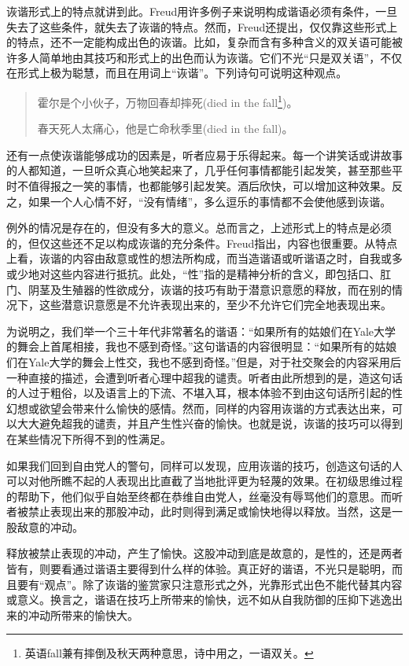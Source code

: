 \documentclass[UTF8,10pt,a4paper,openany]{book}
\begin{document}
诙谐形式上的特点就讲到此。Freud用许多例子来说明构成谐语必须有条件，一旦失去了这些条件，就失去了诙谐的特点。然而，Freud还提出，仅仅靠这些形式上的特点，还不一定能构成出色的诙谐。比如，复杂而含有多种含义的双关语可能被许多人简单地由其技巧和形式上的出色而认为诙谐。它们不光“只是双关语”，不仅在形式上极为聪慧，而且在用词上“诙谐”。下列诗句可说明这种观点。
\begin{quote}
    霍尔是个小伙子，万物回春却摔死(died in the fall\footnote{英语fall兼有摔倒及秋天两种意思，诗中用之，一语双关。})。\vspace{-6pt}
    
    春天死人太痛心，他是亡命秋季里(died in the fall)。
\end{quote}

还有一点使诙谐能够成功的因素是，听者应易于乐得起来。每一个讲笑话或讲故事的人都知道，一旦听众真心地笑起来了，几乎任何事情都能引起发笑，甚至那些平时不值得报之一笑的事情，也都能够引起发笑。酒后欣快，可以增加这种效果。反之，如果一个人心情不好，“没有情绪”，多么逗乐的事情都不会使他感到诙谐。

例外的情况是存在的，但没有多大的意义。总而言之，上述形式上的特点是必须的，但仅这些还不足以构成诙谐的充分条件。Freud指出，内容也很重要。从特点上看，诙谐的内容由敌意或性的想法所构成，而当造谐语或听谐语之时，自我或多或少地对这些内容进行抵抗。此处，“性”指的是精神分析的含义，即包括口、肛门、阴茎及生殖器的性欲成分，诙谐的技巧有助于潜意识意愿的释放，而在别的情况下，这些潜意识意愿是不允许表现出来的，至少不允许它们完全地表现出来。

为说明之，我们举一个三十年代非常著名的谐语：“如果所有的姑娘们在Yale大学的舞会上首尾相接，我也不感到奇怪。”这句谐语的内容很明显：“如果所有的姑娘们在Yale大学的舞会上性交，我也不感到奇怪。”但是，对于社交聚会的内容采用后一种直接的描述，会遭到听者心理中超我的谴责。听者由此所想到的是，造这句话的人过于粗俗，以及语言上的下流、不堪入耳，根本体验不到由这句话所引起的性幻想或欲望会带来什么愉快的感情。然而，同样的内容用诙谐的方式表达出来，可以大大避免超我的谴责，并且产生性兴奋的愉快。也就是说，诙谐的技巧可以得到在某些情况下所得不到的性满足。

如果我们回到自由党人的警句，同样可以发现，应用诙谐的技巧，创造这句话的人可以对他所瞧不起的人表现出比直截了当地批评更为轻蔑的效果。在初级思维过程的帮助下，他们似乎自始至终都在恭维自由党人，丝毫没有辱骂他们的意思。而听者被禁止表现出来的那股冲动，此时则得到满足或愉快地得以释放。当然，这是一股敌意的冲动。

释放被禁止表现的冲动，产生了愉快。这股冲动到底是故意的，是性的，还是两者皆有，则要看通过谐语主要得到什么样的体验。真正好的谐语，不光只是聪明，而且要有“观点”。除了诙谐的鉴赏家只注意形式之外，光靠形式出色不能代替其内容或意义。换言之，谐语在技巧上所带来的愉快，远不如从自我防御的压抑下逃逸出来的冲动所带来的愉快大。
\end{document}
